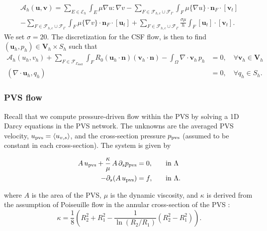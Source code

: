 \begin{multline}
\mathcal{A}_h (\bm u, \bm v) = \sum_{E \in \mathcal{E}_h} \int_{E} \mu \nabla u : \nabla v - \sum_{
F \in \mathcal{F}_{h,c} \cup \mathcal{F}_{\Gamma} 
} \int_{F} \mu \{\nabla u\}\cdot \bm n_F \cdot [\bm v_t] 
\\ - \sum_{
F \in \mathcal{F}_{h,c} \cup \mathcal{F}_{\Gamma} 
} \int_{F} \mu \{\nabla v\}\cdot \bm n_F \cdot [\bm u_t]
+ \sum_{
F \in \mathcal{F}_{h,c} \cup \mathcal{F}_{\Gamma} 
} \frac{\sigma \mu}{h} \int_{F} [\bm u_t ] \cdot [\bm v_t].   
\end{multline}
We set $\sigma =20$. The discretization for the CSF flow, is then to find $(\bm u_h, p_h) \in \bm V_h \times S_h$ such  that 
\begin{align}
\mathcal{A}_h(u_h, v_h)  + \sum_{F \in \mathcal{F}_{\Gamma_{\mathrm{skull}}}} \int_{F} R_0 (\bm u_h \cdot \bm n) (\bm v_h \cdot \bm n) - \int_{\Omega} \nabla \cdot \bm v_h \, p_h  & = 0, \quad \forall \bm v_h \in \bm V_h   \\ 
(\nabla \cdot \bm u_h , q_h ) & = 0, \quad \forall q_h \in S_h.
\end{align}
\subsubsection{PVS flow} 


Recall that we compute pressure-driven flow within the PVS by solving a 1D Darcy equations in the PVS network. The unknowns are the averaged PVS velocity, $u_{\rm pvs} = \langle u_{v,s} \rangle$, and the cross-section pressure $p_{\rm pvs} $ (assumed to be constant in each cross-section). The system is given by  \cite{daversin2022geometrically, 
gjerde2024directional} 

\begin{alignat}{2}
A \,  u_{\rm pvs}   + \frac{\kappa}{\mu} \, A \, \partial_{s} p_{\rm pvs} & = 0, &&  \quad \rm in  \,\, \Lambda  \\ 
-\partial_s (A \, u_{\rm pvs}) & = f, && \quad \rm in  \,\, \Lambda .  
\end{alignat} 

where $A$ is the area of the PVS, $\mu$ is the dynamic viscosity, and $\kappa$ is derived from the assumption of Poiseuille flow in the annular cross-section of the PVS  \cite{daversin2022geometrically,tithof2022network}: 
\begin{equation}
\kappa = \frac18 \left( R_2^2 + R_1^2 - \frac{1}{\ln(R_2/R_1)} (R_2^2- R_1^2) \right). 
\end{equation}

